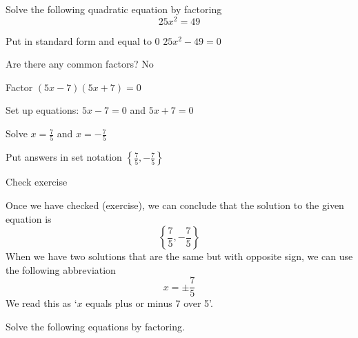 \begin{myexample}
Solve the following quadratic equation by factoring
\[
	25x^2=49
\]
\end{myexample}
\begin{myProof}
	\begin{steps}
		\item Put in standard form and equal to 0 \hfill $25x^2-49=0$                           
		\item	Are there any common factors?       \hfill No                                 
		\item	Factor                              \hfill $(5x-7)(5x+7)=0$                       
		\item	Set up equations:                   \hfill $5x-7=0$  and  $5x+7=0$                
		\item	Solve                               \hfill $x=\frac{7}{5}$  and  $x=-\frac{7}{5}$ 
		\item	Put answers in set notation         \hfill $\left\{\frac{7}{5}, -\frac{7}{5}\right\}$
		\item Check   \hfill exercise
	\end{steps}
	Once we have checked (exercise), we can conclude that the solution to the given equation is
	\[
		\left\{\frac{7}{5}, -\frac{7}{5}\right\}
	\] 
	When we have two solutions that are the same but with opposite sign, we can use the following abbreviation
	\[
		x = \pm \frac{7}{5}
	\]
	We read this as `$x$ equals plus or minus 7 over 5'.
\end{myProof} 

\begin{myexample}
Solve the following equations by factoring.
\drillandskill
\end{myexample}

